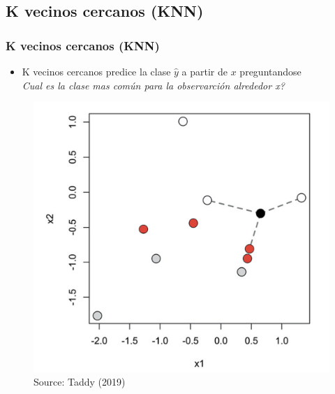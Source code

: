 \documentclass[
  shownotes,
  xcolor={svgnames},
  hyperref={colorlinks,citecolor=DarkBlue,linkcolor=DarkRed,urlcolor=DarkBlue}
  , aspectratio=169]{beamer}
\begin{document}
\subsection{K vecinos cercanos (KNN)}
\begin{frame}[fragile]
\frametitle{K vecinos cercanos (KNN)}

\begin{itemize}
\item K vecinos cercanos predice la clase $\hat y$ a partir de $x$ preguntandose \\
{\it Cual es la clase mas común para la observarción alrededor x?}
\end{itemize}
        \begin{figure}[H] \centering
            \captionsetup{justification=centering}
              \includegraphics[scale=0.13]{figures/knn}
              \\
              \tiny
              Source: Taddy (2019)
 \end{figure}

 \end{frame}
\end{document}
